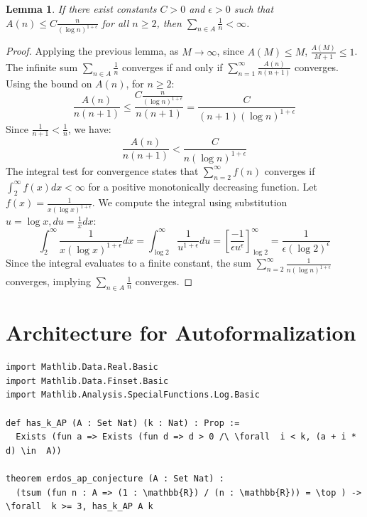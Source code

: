 \documentclass[11pt, a4paper]{article}
\newtheorem{lemma}[theorem]{Lemma}
\begin{document}
\begin{lemma}
If there exist constants $C > 0$ and $\epsilon > 0$ such that $A(n) \le C \frac{n}{(\log n)^{1+\epsilon}}$ for all $n \ge 2$, then $\sum_{n \in A} \frac{1}{n} < \infty$.
\end{lemma}
\begin{proof}
Applying the previous lemma, as $M \to \infty$, since $A(M) \le M$, $\frac{A(M)}{M+1} \le 1$. The infinite sum $\sum_{n \in A} \frac{1}{n}$ converges if and only if $\sum_{n=1}^\infty \frac{A(n)}{n(n+1)}$ converges. Using the bound on $A(n)$, for $n \ge 2$:
$$ \frac{A(n)}{n(n+1)} \le \frac{C \frac{n}{(\log n)^{1+\epsilon}}}{n(n+1)} = \frac{C}{(n+1)(\log n)^{1+\epsilon}} $$
Since $\frac{1}{n+1} < \frac{1}{n}$, we have:
$$ \frac{A(n)}{n(n+1)} < \frac{C}{n(\log n)^{1+\epsilon}} $$
The integral test for convergence states that $\sum_{n=2}^\infty f(n)$ converges if $\int_2^\infty f(x)dx < \infty$ for a positive monotonically decreasing function. Let $f(x) = \frac{1}{x(\log x)^{1+\epsilon}}$. We compute the integral using substitution $u = \log x, du = \frac{1}{x}dx$:
$$ \int_2^\infty \frac{1}{x(\log x)^{1+\epsilon}} dx = \int_{\log 2}^\infty \frac{1}{u^{1+\epsilon}} du = \left[ \frac{-1}{\epsilon u^\epsilon} \right]_{\log 2}^\infty = \frac{1}{\epsilon (\log 2)^\epsilon} $$
Since the integral evaluates to a finite constant, the sum $\sum_{n=2}^\infty \frac{1}{n(\log n)^{1+\epsilon}}$ converges, implying $\sum_{n \in A} \frac{1}{n}$ converges.
\end{proof}


\section{Architecture for Autoformalization}
\begin{verbatim}
import Mathlib.Data.Real.Basic
import Mathlib.Data.Finset.Basic
import Mathlib.Analysis.SpecialFunctions.Log.Basic

def has_k_AP (A : Set Nat) (k : Nat) : Prop :=
  Exists (fun a => Exists (fun d => d > 0 /\ \forall  i < k, (a + i * d) \in  A))

theorem erdos_ap_conjecture (A : Set Nat) :
  (tsum (fun n : A => (1 : \mathbb{R}) / (n : \mathbb{R})) = \top ) -> \forall  k >= 3, has_k_AP A k
\end{verbatim}
\end{document}

